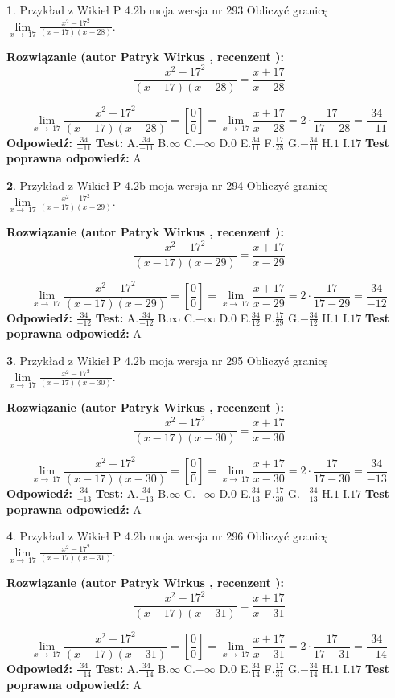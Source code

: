 \documentclass[12pt, a4paper]{article}
\theoremstyle{definition} %
\newtheorem{zad}{}
\newcommand{\zadStart}[1]{\begin{zad}#1\newline}
\newcommand{\zadStop}{\end{zad}}
\newcommand{\rozwStart}[2]{\noindent \textbf{Rozwiązanie (autor #1 , recenzent #2): }\newline}
\newcommand{\rozwStop}{\newline}
\newcommand{\odpStart}{\noindent \textbf{Odpowiedź:}\newline}
\newcommand{\odpStop}{\newline}
\newcommand{\testStart}{\noindent \textbf{Test:}\newline}
\newcommand{\testStop}{\newline}
\newcommand{\kluczStart}{\noindent \textbf{Test poprawna odpowiedź:}\newline}
\newcommand{\kluczStop}{\newline}
\begin{document}
\zadStart{Przykład z Wikieł P 4.2b moja wersja nr 293}
Obliczyć granicę $\lim\limits_{x\to\ 17}\frac{x^{2}-17^{2}}{(x-17)(x-28)}$.
\zadStop
\rozwStart{Patryk Wirkus}{}
$$\frac{x^{2}-17^{2}}{(x-17)(x-28)}=\frac{x+17}{x-28}$$

$$\lim\limits_{x\to\ 17}\frac{x^{2}-17^{2}}{(x-17)(x-28)}=[\frac{0}{0}]=\lim\limits_{x\to\ 17}\frac{x+17}{x-28}=2 \cdot \frac{17}{17-28} = \frac{34}{-11}$$
\rozwStop
\odpStart
$\frac{34}{-11}$
\odpStop
\testStart
A.$\frac{34}{-11}$
B.$\infty$
C.$-\infty$
D.$0$
E.$\frac{34}{11}$
F.$\frac{17}{28}$
G.$-\frac{34}{11}$
H.$1$
I.$17$
\testStop
\kluczStart
A
\kluczStop



\zadStart{Przykład z Wikieł P 4.2b moja wersja nr 294}
Obliczyć granicę $\lim\limits_{x\to\ 17}\frac{x^{2}-17^{2}}{(x-17)(x-29)}$.
\zadStop
\rozwStart{Patryk Wirkus}{}
$$\frac{x^{2}-17^{2}}{(x-17)(x-29)}=\frac{x+17}{x-29}$$

$$\lim\limits_{x\to\ 17}\frac{x^{2}-17^{2}}{(x-17)(x-29)}=[\frac{0}{0}]=\lim\limits_{x\to\ 17}\frac{x+17}{x-29}=2 \cdot \frac{17}{17-29} = \frac{34}{-12}$$
\rozwStop
\odpStart
$\frac{34}{-12}$
\odpStop
\testStart
A.$\frac{34}{-12}$
B.$\infty$
C.$-\infty$
D.$0$
E.$\frac{34}{12}$
F.$\frac{17}{29}$
G.$-\frac{34}{12}$
H.$1$
I.$17$
\testStop
\kluczStart
A
\kluczStop



\zadStart{Przykład z Wikieł P 4.2b moja wersja nr 295}
Obliczyć granicę $\lim\limits_{x\to\ 17}\frac{x^{2}-17^{2}}{(x-17)(x-30)}$.
\zadStop
\rozwStart{Patryk Wirkus}{}
$$\frac{x^{2}-17^{2}}{(x-17)(x-30)}=\frac{x+17}{x-30}$$

$$\lim\limits_{x\to\ 17}\frac{x^{2}-17^{2}}{(x-17)(x-30)}=[\frac{0}{0}]=\lim\limits_{x\to\ 17}\frac{x+17}{x-30}=2 \cdot \frac{17}{17-30} = \frac{34}{-13}$$
\rozwStop
\odpStart
$\frac{34}{-13}$
\odpStop
\testStart
A.$\frac{34}{-13}$
B.$\infty$
C.$-\infty$
D.$0$
E.$\frac{34}{13}$
F.$\frac{17}{30}$
G.$-\frac{34}{13}$
H.$1$
I.$17$
\testStop
\kluczStart
A
\kluczStop



\zadStart{Przykład z Wikieł P 4.2b moja wersja nr 296}
Obliczyć granicę $\lim\limits_{x\to\ 17}\frac{x^{2}-17^{2}}{(x-17)(x-31)}$.
\zadStop
\rozwStart{Patryk Wirkus}{}
$$\frac{x^{2}-17^{2}}{(x-17)(x-31)}=\frac{x+17}{x-31}$$

$$\lim\limits_{x\to\ 17}\frac{x^{2}-17^{2}}{(x-17)(x-31)}=[\frac{0}{0}]=\lim\limits_{x\to\ 17}\frac{x+17}{x-31}=2 \cdot \frac{17}{17-31} = \frac{34}{-14}$$
\rozwStop
\odpStart
$\frac{34}{-14}$
\odpStop
\testStart
A.$\frac{34}{-14}$
B.$\infty$
C.$-\infty$
D.$0$
E.$\frac{34}{14}$
F.$\frac{17}{31}$
G.$-\frac{34}{14}$
H.$1$
I.$17$
\testStop
\kluczStart
A
\kluczStop
\end{document}
